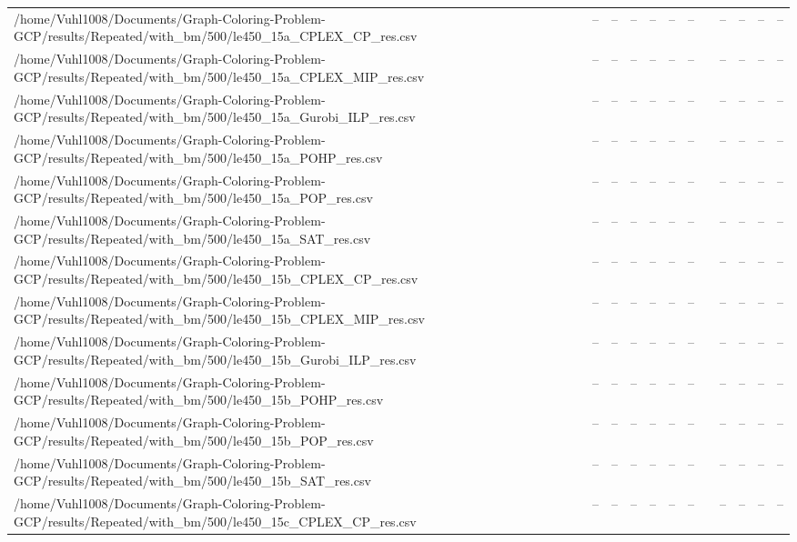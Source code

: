 \begin{table}[htbp]
\begin{tabular}{llllllllllll}
/home/Vuhl1008/Documents/Graph-Coloring-Problem-GCP/results/Repeated/with\_bm/500/le450\_15a\_CPLEX\_CP\_res.csv & -- & -- & -- & -- & -- & -- & {} & -- & -- & -- & -- \\
/home/Vuhl1008/Documents/Graph-Coloring-Problem-GCP/results/Repeated/with\_bm/500/le450\_15a\_CPLEX\_MIP\_res.csv & -- & -- & -- & -- & -- & -- & {} & -- & -- & -- & -- \\
/home/Vuhl1008/Documents/Graph-Coloring-Problem-GCP/results/Repeated/with\_bm/500/le450\_15a\_Gurobi\_ILP\_res.csv & -- & -- & -- & -- & -- & -- & {} & -- & -- & -- & -- \\
/home/Vuhl1008/Documents/Graph-Coloring-Problem-GCP/results/Repeated/with\_bm/500/le450\_15a\_POHP\_res.csv & -- & -- & -- & -- & -- & -- & {} & -- & -- & -- & -- \\
/home/Vuhl1008/Documents/Graph-Coloring-Problem-GCP/results/Repeated/with\_bm/500/le450\_15a\_POP\_res.csv & -- & -- & -- & -- & -- & -- & {} & -- & -- & -- & -- \\
/home/Vuhl1008/Documents/Graph-Coloring-Problem-GCP/results/Repeated/with\_bm/500/le450\_15a\_SAT\_res.csv & -- & -- & -- & -- & -- & -- & {} & -- & -- & -- & -- \\
/home/Vuhl1008/Documents/Graph-Coloring-Problem-GCP/results/Repeated/with\_bm/500/le450\_15b\_CPLEX\_CP\_res.csv & -- & -- & -- & -- & -- & -- & {} & -- & -- & -- & -- \\
/home/Vuhl1008/Documents/Graph-Coloring-Problem-GCP/results/Repeated/with\_bm/500/le450\_15b\_CPLEX\_MIP\_res.csv & -- & -- & -- & -- & -- & -- & {} & -- & -- & -- & -- \\
/home/Vuhl1008/Documents/Graph-Coloring-Problem-GCP/results/Repeated/with\_bm/500/le450\_15b\_Gurobi\_ILP\_res.csv & -- & -- & -- & -- & -- & -- & {} & -- & -- & -- & -- \\
/home/Vuhl1008/Documents/Graph-Coloring-Problem-GCP/results/Repeated/with\_bm/500/le450\_15b\_POHP\_res.csv & -- & -- & -- & -- & -- & -- & {} & -- & -- & -- & -- \\
/home/Vuhl1008/Documents/Graph-Coloring-Problem-GCP/results/Repeated/with\_bm/500/le450\_15b\_POP\_res.csv & -- & -- & -- & -- & -- & -- & {} & -- & -- & -- & -- \\
/home/Vuhl1008/Documents/Graph-Coloring-Problem-GCP/results/Repeated/with\_bm/500/le450\_15b\_SAT\_res.csv & -- & -- & -- & -- & -- & -- & {} & -- & -- & -- & -- \\
/home/Vuhl1008/Documents/Graph-Coloring-Problem-GCP/results/Repeated/with\_bm/500/le450\_15c\_CPLEX\_CP\_res.csv & -- & -- & -- & -- & -- & -- & {} & -- & -- & -- & -- \\

\end{tabular}
\end{table}
